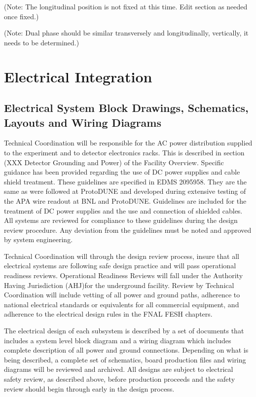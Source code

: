 (Note: The longitudinal position is not fixed at this time. Edit
section as needed once fixed.)


(Note: Dual phase should be similar
transversely and longitudinally, vertically, it needs to be
determined.)






\section{Electrical Integration}
\label{sec:fdsp-Integ-electrical}



\subsection{Electrical System Block Drawings, Schematics, Layouts and Wiring Diagrams}
\label{sec:fdsp-coord-electrical}


Technical Coordination will be responsible for the AC power distribution supplied to the experiment and to detector electronics racks.  This is described in section (XXX Detector Grounding and Power) of the Facility Overview.  Specific guidance has been provided regarding the use of DC power supplies and cable shield treatment.  These guidelines are specified in EDMS 2095958.  They are the same as were followed at ProtoDUNE and developed during extensive testing of the APA wire readout at BNL and ProtoDUNE.  Guidelines are included for the treatment of DC power supplies and the use and connection of shielded cables.  All systems are reviewed for compliance to these guidelines during the design review procedure.  Any deviation from the guidelines must be noted and approved by system engineering.

Technical Coordination will through the design review process, insure that all electrical systems are following safe design practice and will pass operational readiness reviews.  Operational Readiness Reviews will fall under the Authority Having Jurisdiction (AHJ)for the underground facility.  Review by Technical Coordination will include vetting of all power and ground paths, adherence to national electrical standards or equivalents for all commercial equipment,  and adherence to the electrical design rules in the FNAL FESH chapters.


The electrical design of each subsystem is described by a
set of documents that includes a system level block
diagram and a wiring diagram which includes complete description of all power and ground connections.
Depending on what is being described, a complete set of schematics,
board production files and wiring diagrams will be reviewed and archived.  All
designs are subject to electrical safety review, as described above, before production proceeds 
and the safety review should begin through
 early in the design process.



